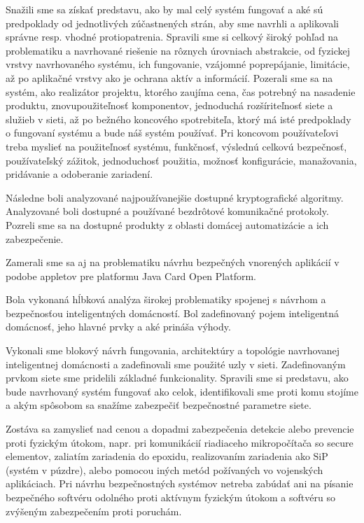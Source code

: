 \documentclass[12pt,a4paper,oneside,openright]{report}
\begin{document}
Snažili sme sa získať predstavu, ako by mal celý systém fungovať a aké sú predpoklady od jednotlivých zúčastnených strán, aby sme navrhli a aplikovali správne resp. vhodné protiopatrenia.
Spravili sme si celkový široký pohľad na problematiku a navrhované riešenie na rôznych úrovniach abstrakcie, od fyzickej vrstvy navrhovaného systému, ich fungovanie, vzájomné poprepájanie, limitácie, až po aplikačné vrstvy ako je ochrana aktív a informácií. Pozerali sme sa na systém, ako realizátor projektu, ktorého zaujíma cena, čas potrebný na nasadenie produktu, znovupoužiteľnosť komponentov, jednoduchá rozšíriteľnosť siete a služieb v sieti, až po bežného koncového spotrebiteľa, ktorý má isté predpoklady o fungovaní systému a bude náš systém používať. Pri koncovom používateľovi treba myslieť na použiteľnosť systému, funkčnosť, výslednú celkovú bezpečnosť, používateľský zážitok, jednoduchosť použitia, možnosť konfigurácie, manažovania, pridávanie a odoberanie zariadení.

Následne boli analyzované najpoužívanejšie dostupné kryptografické algoritmy.
Analyzované boli dostupné a používané bezdrôtové komunikačné protokoly.
Pozreli sme sa na dostupné produkty z oblasti domácej automatizácie a ich zabezpečenie.

Zamerali sme sa aj na problematiku návrhu bezpečných vnorených aplikácií v podobe appletov pre platformu Java Card Open Platform.

Bola vykonaná hĺbková analýza širokej problematiky spojenej s návrhom a bezpečnosťou inteligentných domácností.
Bol zadefinovaný pojem inteligentná domácnosť, jeho hlavné prvky a aké prináša výhody.

Vykonali sme blokový návrh fungovania, architektúry a topológie navrhovanej inteligentnej domácnosti a zadefinovali sme použité uzly v sieti. Zadefinovaným prvkom siete sme pridelili základné funkcionality. Spravili sme si predstavu, ako bude navrhovaný systém fungovať ako celok, identifikovali sme proti komu stojíme a akým spôsobom sa snažíme zabezpečiť bezpečnostné parametre siete.

Zostáva sa zamyslieť nad cenou a dopadmi zabezpečenia detekcie alebo prevencie proti fyzickým útokom, napr. pri komunikácií riadiaceho mikropočítača so secure elementov, zaliatím zariadenia do epoxidu, realizovaním zariadenia ako SiP (systém v púzdre), alebo pomocou iných metód požívaných vo vojenských aplikáciach. Pri návrhu bezpečnostných systémov netreba zabúdať ani na písanie bezpečného softvéru odolného proti aktívnym fyzickým útokom a softvéru so zvýšeným zabezpečením proti poruchám.
\end{document}
